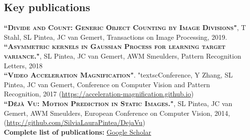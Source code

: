 \documentclass[a4paper, oneside, final]{scrartcl}
\begin{document}
\begin{center}
		\section{Key publications}
        \begin{flushleft}
			\textsc{\textbf{``Divide and Count: Generic Object Counting by Image Divisions"}}, T Stahl, SL Pintea, JC van Gemert, 
            Transactions on Image Processing, 2019.\\[3px]
			\textsc{\textbf{``Asymmetric kernels in Gaussian Process for learning target variance."}}, SL Pintea, JC van Gemert, AWM Smeulders, 
            Pattern Recognition Letters, 2018\\[3px] 
			\textsc{\textbf{``Video Acceleration Magnification"}}. "textsc{Conference}, Y Zhang, SL Pintea, JC van Gemert, 
            Conference on Computer Vision and Pattern Recognition, 2017 
            (\small\href{https://acceleration-magnification.github.io}{https://acceleration-magnification.github.io}) \\[3px]
            \textsc{\textbf{``D\'{e}j\`{a} Vu: Motion Prediction in Static Images."}}, SL Pintea, JC van Gemert, AWM Smeulders, 
            European Conference on Computer Vision, 2014, 
            (\small\href{http://github.com/SilviaLauraPintea/DejaVu}{http://github.com/SilviaLauraPintea/DejaVu})\\[10px]

            \textbf{Complete list of publications:} \href{https://scholar.google.nl/citations?user=shTkx9EAAAAJ&hl=en}{Google Scholar}\\
        \end{flushleft}

\end{center}
\end{document}
